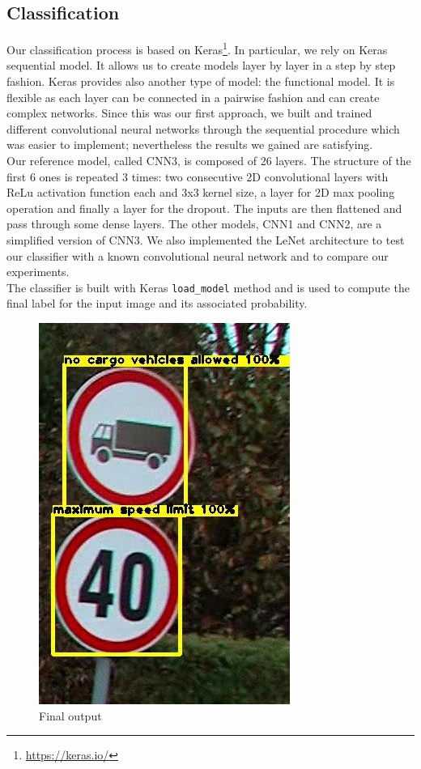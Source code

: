 \documentclass[10pt,twocolumn,letterpaper]{article}
\begin{document}
\subsection{Classification}
Our classification process is based on Keras\footnote{\url{https://keras.io/}}. In particular, we rely on Keras sequential model. It allows us to create models layer by layer in a step by step fashion. Keras provides also another type of model: the functional model. It is flexible as each layer can be connected in a pairwise fashion and can create complex networks. Since this was our first approach, we built and trained different convolutional neural networks through the sequential procedure which was easier to implement; nevertheless the results we gained are satisfying.\\
Our reference model, called CNN3, is composed of 26 layers. The structure of the first 6 ones is repeated 3 times: two consecutive 2D convolutional layers with ReLu activation function each and $3$x$3$ kernel size, a layer for 2D max pooling operation and finally a layer for the dropout. The inputs are then flattened and pass through some dense layers. The other models, CNN1 and CNN2, are a simplified version of CNN3. We also implemented the LeNet architecture to test our classifier with a known convolutional neural network and to compare our experiments.\\
The classifier is built with Keras \texttt{load\_model} method and is used to compute the final label for the input image and its associated probability.
\begin{figure}[h]
	\centering\includegraphics[scale=0.5]{Res/Immagini/classExample.jpg}	
	\caption{Final output}
\end{figure}
\end{document}
